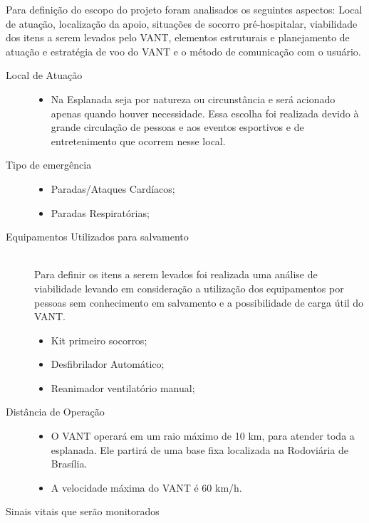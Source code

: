 \label{escopo}
Para definição do escopo do projeto foram analisados os seguintes aspectos: Local de atuação, localização da apoio, situações de socorro pré-hospitalar, viabilidade dos itens a serem levados pelo VANT, elementos estruturais e planejamento de atuação e estratégia de voo do VANT e o método de comunicação com o usuário.
\begin{description}
  \item[Local de Atuação] \hfill 
  	\begin{itemize}
  		\item Na Esplanada seja por natureza ou circunstância e será acionado apenas quando houver necessidade. Essa escolha foi realizada devido à grande circulação de pessoas e aos eventos esportivos e de entretenimento que ocorrem nesse local.

  	\end{itemize}
  \item[Tipo de emergência] \hfill 
  	\begin{itemize}
  		\item Paradas/Ataques Cardíacos;
		\item Paradas Respiratórias;
  	\end{itemize}
  \item[Equipamentos Utilizados para salvamento] \hfill \\
  	Para definir os itens a serem levados foi realizada uma análise de viabilidade levando em consideração a utilização dos equipamentos por pessoas sem conhecimento em salvamento e a possibilidade de carga útil do VANT.
  	\begin{itemize}
  		\item Kit primeiro socorros;
		\item Desfibrilador Automático;
		\item Reanimador ventilatório manual;
  	\end{itemize}
  \item[Distância de Operação] \hfill 
  	\begin{itemize}
	  
	  \item O VANT operará em um raio máximo de 10 km, para atender toda a esplanada. Ele partirá de uma base fixa localizada na Rodoviária de Brasília.

	  \item A velocidade máxima do VANT é 60 km/h.  
  	\end{itemize}
  \item[Sinais vitais que serão monitorados] \hfill 
  	\begin{itemize}
	

\end{itemize}
\end{description}
